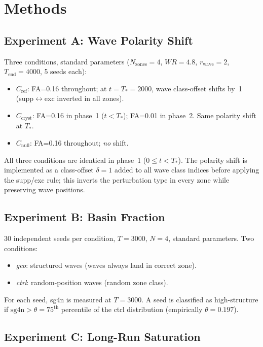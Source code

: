 \documentclass[11pt]{article}
\begin{document}
\section{Methods}

\subsection{Experiment A: Wave Polarity Shift}

Three conditions, standard parameters ($N_\mathrm{zones}=4$, $WR=4.8$,
$r_\mathrm{wave}=2$, $T_\mathrm{end}=4000$, 5 seeds each):
\begin{itemize}
  \item $C_\mathrm{ref}$: FA=0.16 throughout; at $t=T_*=2000$, wave
        class-offset shifts by~1 (supp$\leftrightarrow$exc inverted in all zones).
  \item $C_\mathrm{cryst}$: FA=0.16 in phase~1 ($t<T_*$); FA=0.01 in phase~2.
        Same polarity shift at $T_*$.
  \item $C_\mathrm{null}$: FA=0.16 throughout; \emph{no} shift.
\end{itemize}
All three conditions are identical in phase~1 ($0\le t<T_*$).
The polarity shift is implemented as a class-offset $\delta=1$ added to all
wave class indices before applying the supp/exc rule; this inverts the
perturbation type in every zone while preserving wave positions.

\subsection{Experiment B: Basin Fraction}

30 independent seeds per condition, $T=3000$, $N=4$, standard parameters.
Two conditions:
\begin{itemize}
  \item \emph{geo}: structured waves (waves always land in correct zone).
  \item \emph{ctrl}: random-position waves (random zone class).
\end{itemize}
For each seed, sg4n is measured at $T=3000$.
A seed is classified as high-structure if
$\mathrm{sg4n} > \theta = 75^\mathrm{th}$ percentile of the ctrl distribution
(empirically $\theta=0.197$).

\subsection{Experiment C: Long-Run Saturation}
\end{document}
